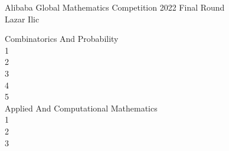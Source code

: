 \Large
Alibaba Global Mathematics Competition 2022 Final Round \\
Lazar Ilic

Combinatorics And Probability \\
1 \\


2 \\


3 \\


4 \\


5 \\


Applied And Computational Mathematics \\
1 \\


2 \\


3 \\
